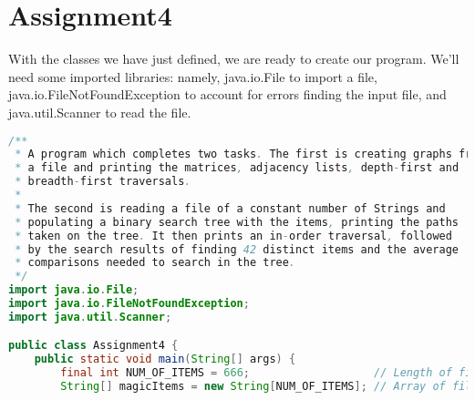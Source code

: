 \documentclass[letterpaper, 10pt]{article}
\begin{document}
\section{Assignment4}

\hspace{1.0em}With the classes we have just defined, we are ready to create our program. We'll need some imported libraries: namely, java.io.File to import a file, java.io.FileNotFoundException to account for errors finding the input file, and java.util.Scanner to read the file.

\vspace{5.0em}

\begin{lstlisting}[language=Java]
/**
 * A program which completes two tasks. The first is creating graphs from
 * a file and printing the matrices, adjacency lists, depth-first and
 * breadth-first traversals.
 * 
 * The second is reading a file of a constant number of Strings and
 * populating a binary search tree with the items, printing the paths
 * taken on the tree. It then prints an in-order traversal, followed
 * by the search results of finding 42 distinct items and the average
 * comparisons needed to search in the tree.
 */
import java.io.File;
import java.io.FileNotFoundException;
import java.util.Scanner;

public class Assignment4 {
    public static void main(String[] args) {
        final int NUM_OF_ITEMS = 666;                   // Length of file as constant
        String[] magicItems = new String[NUM_OF_ITEMS]; // Array of file strings


\end{lstlisting}
\end{document}
